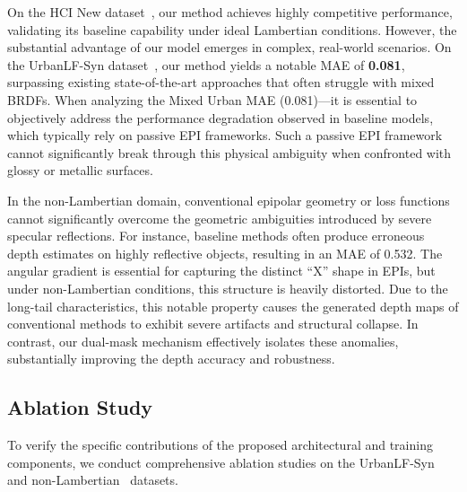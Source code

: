 \documentclass[lettersize,journal]{IEEEtran}
\begin{document}
On the HCI New dataset~\cite{heber2018}, our method achieves highly competitive performance, validating its baseline capability under ideal Lambertian conditions. However, the substantial advantage of our model emerges in complex, real-world scenarios. On the UrbanLF-Syn dataset~\cite{honauer2016}, our method yields a notable MAE of \textbf{0.081}, surpassing existing state-of-the-art approaches that often struggle with mixed BRDFs. When analyzing the Mixed Urban MAE (0.081)---it is essential to objectively address the performance degradation observed in baseline models, which typically rely on passive EPI frameworks. Such a passive EPI framework cannot significantly break through this physical ambiguity when confronted with glossy or metallic surfaces.

In the non-Lambertian domain, conventional epipolar geometry or loss functions cannot significantly overcome the geometric ambiguities introduced by severe specular reflections. For instance, baseline methods often produce erroneous depth estimates on highly reflective objects, resulting in an MAE of 0.532. The angular gradient is essential for capturing the distinct ``X'' shape in EPIs, but under non-Lambertian conditions, this structure is heavily distorted. Due to the long-tail characteristics, this notable property causes the generated depth maps of conventional methods to exhibit severe artifacts and structural collapse. In contrast, our dual-mask mechanism effectively isolates these anomalies, substantially improving the depth accuracy and robustness.

\subsection{Ablation Study}

To verify the specific contributions of the proposed architectural and training components, we conduct comprehensive ablation studies on the UrbanLF-Syn~\cite{honauer2016} and non-Lambertian~\cite{drmcolo} datasets.
\end{document}
